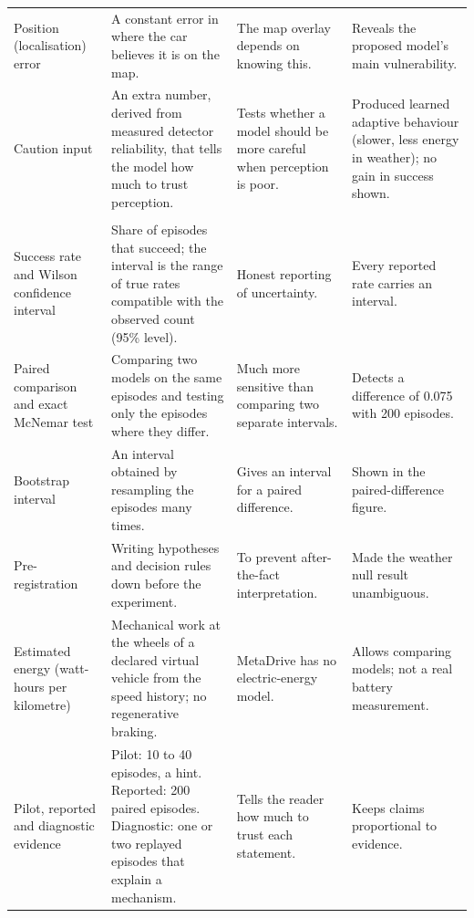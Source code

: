 {\begin{longtable}{@{}>{\raggedright\arraybackslash}p{3.1cm}>{\raggedright\arraybackslash}p{4.6cm}>{\raggedright\arraybackslash}p{3.7cm}>{\raggedright\arraybackslash}p{4.0cm}@{}}
Position (localisation) error & A constant error in where the car believes it is on the map. & The map overlay depends on knowing this. & Reveals the proposed model's main vulnerability.\\
Caution input & An extra number, derived from measured detector reliability, that tells the model how much to trust perception. & Tests whether a model should be more careful when perception is poor. & Produced learned adaptive behaviour (slower, less energy in weather); no gain in success shown.\\
\multicolumn{4}{@{}l}{\textbf{Evaluation and statistics}}\\
Success rate and Wilson confidence interval & Share of episodes that succeed; the interval is the range of true rates compatible with the observed count (95\% level). & Honest reporting of uncertainty. & Every reported rate carries an interval.\\
Paired comparison and exact McNemar test & Comparing two models on the same episodes and testing only the episodes where they differ. & Much more sensitive than comparing two separate intervals. & Detects a difference of 0.075 with 200 episodes.\\
Bootstrap interval & An interval obtained by resampling the episodes many times. & Gives an interval for a paired difference. & Shown in the paired-difference figure.\\
Pre-registration & Writing hypotheses and decision rules down before the experiment. & To prevent after-the-fact interpretation. & Made the weather null result unambiguous.\\
Estimated energy (watt-hours per kilometre) & Mechanical work at the wheels of a declared virtual vehicle from the speed history; no regenerative braking. & MetaDrive has no electric-energy model. & Allows comparing models; not a real battery measurement.\\
Pilot, reported and diagnostic evidence & Pilot: 10 to 40 episodes, a hint. Reported: 200 paired episodes. Diagnostic: one or two replayed episodes that explain a mechanism. & Tells the reader how much to trust each statement. & Keeps claims proportional to evidence.\\
\end{longtable}
}
